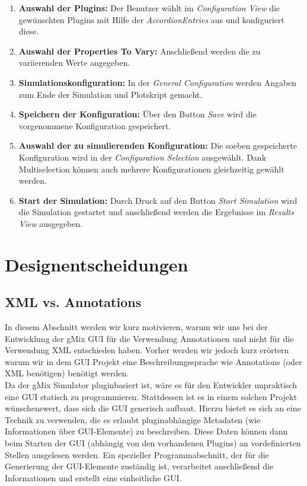 \documentclass[a4paper, 11pt]{article} %
\begin{document}
\begin{enumerate}
\item \textbf{Auswahl der Plugins:} \newline Der Benutzer wählt im \emph{Configuration View} die gewünschten Plugins mit Hilfe der \emph{AccordionEntries} aus und konfiguriert diese.
\item \textbf{Auswahl der Properties To Vary:} \newline Anschließend werden die zu variierenden Werte angegeben.
\item \textbf{Simulationskonfiguration:} \newline In der \emph{General Configuration} werden Angaben zum Ende der Simulation und Plotskript gemacht.
\item \textbf{Speichern der Konfiguration:} \newline Über den Button \emph{Save} wird die vorgenommene Konfiguration gespeichert.
\item \textbf{Auswahl der zu simulierenden Konfiguration:} \newline Die soeben gespeicherte Konfiguration wird in der \emph{Configuration Selection} ausgewählt. Dank Multiselection können auch mehrere Konfigurationen gleichzeitig gewählt werden.
\item \textbf{Start der Simulation:} \newline Durch Druck auf den Button \emph{Start Simulation} wird die Simulation gestartet und anschließend werden die Ergebnisse im \emph{Results View} ausgegeben. 
\end{enumerate}

\section{Designentscheidungen} %
\label{sec:designentscheidungen}

\subsection{XML vs. Annotations} %
\label{sub:xml}
In diesem Abschnitt werden wir kurz motivieren, warum wir uns bei der Entwicklung der gMix GUI für die Verwendung Annotationen und nicht für die Verwendung XML entschieden haben. Vorher werden wir jedoch kurz erörtern warum wir in dem GUI Projekt eine Beschreibungssprache wie Annotations (oder XML benötigen) benötigt werden.\\

Da der gMix Simulator pluginbasiert ist, wäre es für den Entwickler unpraktisch eine GUI statisch zu programmieren. Stattdessen ist es in einem solchen Projekt wünschenswert, dass sich die GUI generisch aufbaut. Hierzu bietet es sich an eine Technik zu verwenden, die es erlaubt pluginabhängige Metadaten (wie Informationen über GUI-Elemente) zu beschreiben. Diese Daten können dann beim Starten der GUI (abhängig von den vorhandenen Plugins) an vordefinierten Stellen ausgelesen werden. Ein spezieller Programmabschnitt, der für die Generierung der GUI-Elemente zuständig ist, verarbeitet anschließend die Informationen und erstellt eine einheitliche GUI.\\
\end{document}
